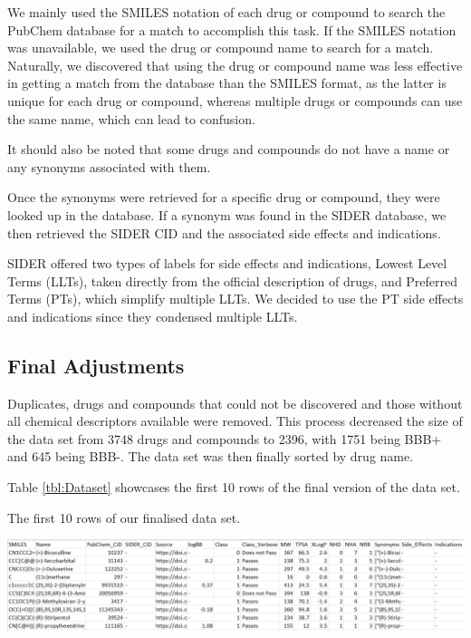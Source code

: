 We mainly used the SMILES notation of each drug or compound to search the PubChem database for a match to accomplish this task. If the SMILES notation was unavailable, we used the drug or compound name to search for a match. Naturally, we discovered that using the drug or compound name was less effective in getting a match from the database than the SMILES format, as the latter is unique for each drug or compound, whereas multiple drugs or compounds can use the same name, which can lead to confusion.

It should also be noted that some drugs and compounds do not have a name or any synonyms associated with them.

Once the synonyms were retrieved for a specific drug or compound, they were looked up in the \citet{SIDER} database. If a synonym was found in the SIDER database, we then retrieved the SIDER CID and the associated side effects and indications. 

SIDER offered two types of labels for side effects and indications, Lowest Level Terms (LLTs), taken directly from the official description of drugs, and Preferred Terms (PTs), which simplify multiple LLTs. We decided to use the PT side effects and indications since they condensed multiple LLTs.

\subsection{Final Adjustments}

Duplicates, drugs and compounds that could not be discovered and those without all chemical descriptors available were removed. This process decreased the size of the data set from 3748 drugs and compounds to 2396, with 1751 being BBB+ and 645 being BBB-. The data set was then finally sorted by drug name.

Table \ref{tbl:Dataset} showcases the first 10 rows of the final version of the data set.

\begin{table}[ht!]
  \caption{The first 10 rows of our finalised data set.}
  \label{tbl:Dataset}
  \includegraphics[width=1.0\linewidth]{images/Dataset.pdf}
\end{table}

